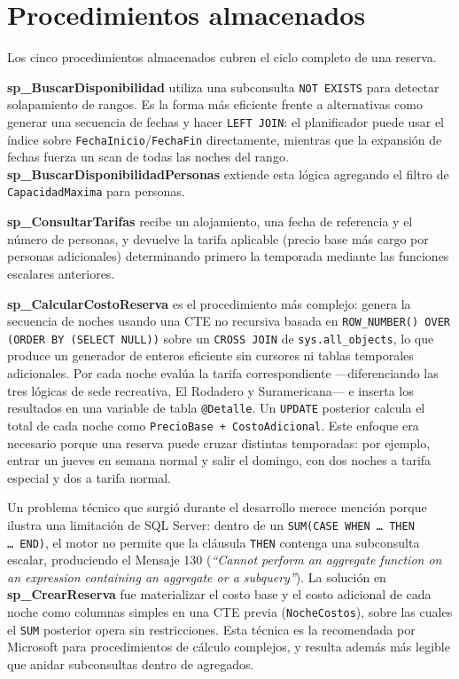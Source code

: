 \documentclass[12pt, letterpaper]{article}
\begin{document}
\section{Procedimientos almacenados}

Los cinco procedimientos almacenados cubren el ciclo completo de una reserva.

\textbf{sp\_BuscarDisponibilidad} utiliza una subconsulta \texttt{NOT EXISTS} para detectar solapamiento de rangos. Es la forma más eficiente frente a alternativas como generar una secuencia de fechas y hacer \texttt{LEFT JOIN}: el planificador puede usar el índice sobre \texttt{FechaInicio}/\texttt{FechaFin} directamente, mientras que la expansión de fechas fuerza un scan de todas las noches del rango. \textbf{sp\_BuscarDisponibilidadPersonas} extiende esta lógica agregando el filtro de \texttt{CapacidadMaxima} para personas.

\textbf{sp\_ConsultarTarifas} recibe un alojamiento, una fecha de referencia y el número de personas, y devuelve la tarifa aplicable (precio base más cargo por personas adicionales) determinando primero la temporada mediante las funciones escalares anteriores.

\textbf{sp\_CalcularCostoReserva} es el procedimiento más complejo: genera la secuencia de noches usando una CTE no recursiva basada en \texttt{ROW\_NUMBER() OVER (ORDER BY (SELECT NULL))} sobre un \texttt{CROSS JOIN} de \texttt{sys.all\_objects}, lo que produce un generador de enteros eficiente sin cursores ni tablas temporales adicionales. Por cada noche evalúa la tarifa correspondiente ---diferenciando las tres lógicas de sede recreativa, El Rodadero y Suramericana--- e inserta los resultados en una variable de tabla \texttt{@Detalle}. Un \texttt{UPDATE} posterior calcula el total de cada noche como \texttt{PrecioBase + CostoAdicional}. Este enfoque era necesario porque una reserva puede cruzar distintas temporadas: por ejemplo, entrar un jueves en semana normal y salir el domingo, con dos noches a tarifa especial y dos a tarifa normal.

Un problema técnico que surgió durante el desarrollo merece mención porque ilustra una limitación de SQL Server: dentro de un \texttt{SUM(CASE WHEN \ldots\ THEN \ldots\ END)}, el motor no permite que la cláusula \texttt{THEN} contenga una subconsulta escalar, produciendo el Mensaje 130 (\emph{``Cannot perform an aggregate function on an expression containing an aggregate or a subquery''}). La solución en \textbf{sp\_CrearReserva} fue materializar el costo base y el costo adicional de cada noche como columnas simples en una CTE previa (\texttt{NocheCostos}), sobre las cuales el \texttt{SUM} posterior opera sin restricciones. Esta técnica es la recomendada por Microsoft para procedimientos de cálculo complejos, y resulta además más legible que anidar subconsultas dentro de agregados.
\end{document}
